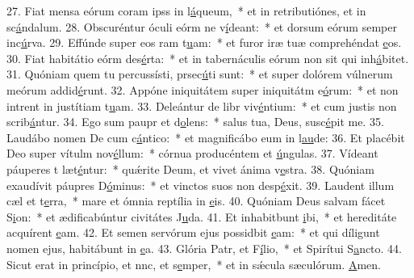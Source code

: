 27. Fiat mensa eórum coram ipss in l\uline{á}queum,~* et in retributiónes, et in sc\uline{á}ndalum.
28. Obscuréntur óculi eórm ne v\uline{í}deant:~* et dorsum eórum semper inc\uline{ú}rva.
29. Effúnde super eos ram t\uline{u}am:~* et furor iræ tuæ comprehéndat \uline{e}os.
30. Fiat habitátio eórm des\uline{é}rta:~* et in tabernáculis eórum non sit qui inh\uline{á}bitet.
31. Quóniam quem tu percussísti, prsec\uline{ú}ti sunt:~* et super dolórem vúlnerum meórum addid\uline{é}runt.
32. Appóne iniquitátem super iniquitátm e\uline{ó}rum:~* et non intrent in justítiam t\uline{u}am.
33. Deleántur de libr viv\uline{é}ntium:~* et cum justis non scrib\uline{á}ntur.
34. Ego sum paupr et d\uline{o}lens:~* salus tua, Deus, susc\uline{é}pit me.
35. Laudábo nomen De cum c\uline{á}ntico:~* et magnificábo eum in l\uline{au}de:
36. Et placébit Deo super vítulm nov\uline{é}llum:~* córnua producéntem et \uline{ú}ngulas.
37. Vídeant páuperes t læt\uline{é}ntur:~* quǽrite Deum, et vivet ánima v\uline{e}stra.
38. Quóniam exaudívit páupres D\uline{ó}minus:~* et vinctos suos non desp\uline{é}xit.
39. Laudent illum cæl et t\uline{e}rra,~* mare et ómnia reptília in \uline{e}is.
40. Quóniam Deus salvam fácet S\uline{i}on:~* et ædificabúntur civitátes J\uline{u}da.
41. Et inhabitbunt \uline{i}bi,~* et hereditáte acquírent \uline{e}am.
42. Et semen servórum ejus possidbit \uline{e}am:~* et qui díligunt nomen ejus, habitábunt in \uline{e}a.
43. Glória Patr, et F\uline{í}lio,~* et Spirítui S\uline{a}ncto.
44. Sicut erat in princípio, et nnc, et s\uline{e}mper,~* et in sǽcula sæculórum. \uline{A}men.
